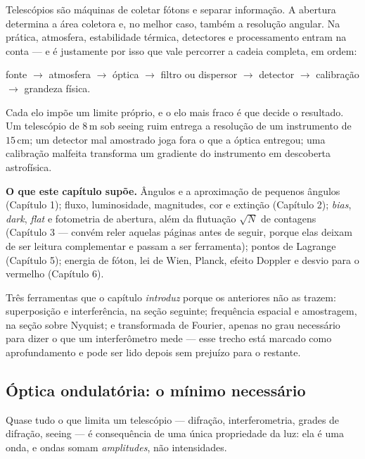 \documentclass[11pt,a4paper]{article}
\begin{document}
Telescópios são máquinas de coletar fótons e separar informação. A abertura determina a área coletora e, no melhor
caso, também a resolução angular. Na prática, atmosfera, estabilidade térmica, detectores e processamento entram
na conta --- e é justamente por isso que vale percorrer a cadeia completa, em ordem:
\begin{center}
fonte $\rightarrow$ atmosfera $\rightarrow$ óptica $\rightarrow$ filtro ou dispersor $\rightarrow$ detector
$\rightarrow$ calibração $\rightarrow$ grandeza física.
\end{center}
Cada elo impõe um limite próprio, e o elo mais fraco é que decide o resultado. Um telescópio de $8\,\mathrm{m}$ sob
seeing ruim entrega a resolução de um instrumento de $15\,\mathrm{cm}$; um detector mal amostrado joga fora o que a
óptica entregou; uma calibração malfeita transforma um gradiente do instrumento em descoberta astrofísica.

\begin{noticebox}
\textbf{O que este capítulo supõe.} Ângulos e a aproximação de pequenos ângulos (Capítulo 1); fluxo, luminosidade,
magnitudes, cor e extinção (Capítulo 2); \textit{bias}, \textit{dark}, \textit{flat} e fotometria de abertura, além
da flutuação $\sqrt{N}$ de contagens (Capítulo 3 --- convém reler aquelas páginas antes de seguir, porque elas
deixam de ser leitura complementar e passam a ser ferramenta); pontos de Lagrange (Capítulo 5); energia de fóton,
lei de Wien, Planck, efeito Doppler e desvio para o vermelho (Capítulo 6).

Três ferramentas que o capítulo \emph{introduz} porque os anteriores não as trazem: superposição e interferência,
na seção seguinte; frequência espacial e amostragem, na seção sobre Nyquist; e transformada de Fourier, apenas no
grau necessário para dizer o que um interferômetro mede --- esse trecho está marcado como aprofundamento e pode
ser lido depois sem prejuízo para o restante.
\end{noticebox}

\subsection*{Óptica ondulatória: o mínimo necessário}

Quase tudo o que limita um telescópio --- difração, interferometria, grades de difração, seeing --- é consequência
de uma única propriedade da luz: ela é uma onda, e ondas somam \emph{amplitudes}, não intensidades.
\end{document}
